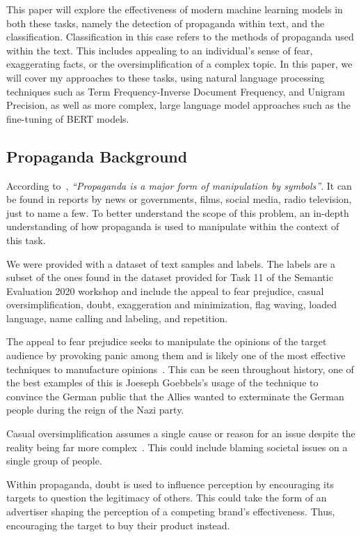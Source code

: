 \documentclass[twocolumn]{article}
\begin{document}
This paper will explore the effectiveness of modern machine learning models in both these tasks, namely the detection of propaganda within text, and the classification. Classification in this case refers to the methods of propaganda used within the text. This includes appealing to an individual's sense of fear, exaggerating facts, or the oversimplification of a complex topic. In this paper, we will cover my approaches to these tasks, using natural language processing techniques such as Term Frequency-Inverse Document Frequency, and Unigram Precision, as well as more complex, large language model approaches such as the fine-tuning of BERT models. 

\subsection{Propaganda Background}

According to~\textcite{scott1994power}, \emph{``Propaganda is a major form of manipulation by symbols''}. It can be found in reports by news or governments, films, social media, radio television, just to name a few. To better understand the scope of this problem, an in-depth understanding of how propaganda is used to manipulate within the context of this task. 

We were provided with a dataset of text samples and labels. The labels are a subset of the ones found in the dataset provided for Task 11 of the Semantic Evaluation 2020 workshop and include the appeal to fear prejudice, casual oversimplification, doubt, exaggeration and minimization, flag waving, loaded language, name calling and labeling, and repetition. 

The appeal to fear prejudice seeks to manipulate the opinions of the target audience by provoking panic among them and is likely one of the most effective techniques to manufacture opinions~\cite{tannenbaum2015appeal}. This can be seen throughout history, one of the best examples of this is Joeseph Goebbels's usage of the technique to convince the German public that the Allies wanted to exterminate the German people during the reign of the Nazi party. 

Casual oversimplification assumes a single cause or reason for an issue despite the reality being far more complex~\cite{da-san-martino-etal-2020-semeval}. This could include blaming societal issues on a single group of people.  

Within propaganda, doubt is used to influence perception by encouraging its targets to question the legitimacy of others. This could take the form of an advertiser shaping the perception of a competing brand's effectiveness. Thus, encouraging the target to buy their product instead. 
\end{document}
